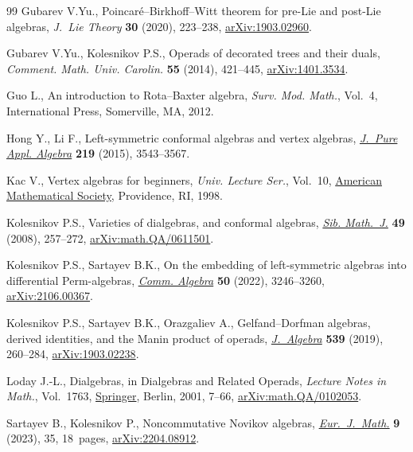 \documentclass[11pt]{article}
\numberwithin{equation}{section}
\numberwithin{equation}{section}
\begin{document}
\begin{thebibliography}{99}
Gubarev V.Yu., Poincar\'e--{B}irkhoff--{W}itt theorem for pre-{L}ie and post-{L}ie
 algebras, \textit{J.~Lie Theory} \textbf{30} (2020), 223--238,
 \href{https://arxiv.org/abs/1903.02960}{arXiv:1903.02960}.

Gubarev V.Yu., Kolesnikov P.S., Operads of decorated trees and their duals,
 \textit{Comment. Math. Univ. Carolin.} \textbf{55} (2014), 421--445,
 \href{https://arxiv.org/abs/1401.3534}{arXiv:1401.3534}.

Guo L., An introduction to {R}ota--{B}axter algebra, \textit{Surv. Mod. Math.},
 Vol.~4, International Press, Somerville, MA, 2012.

Hong Y., Li F., Left-symmetric conformal algebras and vertex algebras,
 \href{https://doi.org/10.1016/j.jpaa.2014.12.012}{\textit{J.~Pure Appl. Algebra}} \textbf{219} (2015), 3543--3567.

Kac V., Vertex algebras for beginners, \textit{Univ. Lecture Ser.}, Vol.~10,
 \href{https://doi.org/10.1090/ulect/010}{American Mathematical Society}, Providence, RI, 1998.

Kolesnikov P.S., Varieties of dialgebras, and conformal algebras, \href{https://doi.org/10.1007/s11202-008-0026-8}{\textit{Sib.
 Math.~J.}} \textbf{49} (2008), 257--272, \href{https://arxiv.org/abs/math.QA/0611501}{arXiv:math.QA/0611501}.

Kolesnikov P.S., Sartayev B.K., On the embedding of left-symmetric algebras
 into differential {P}erm-algebras, \href{https://doi.org/10.1080/00927872.2022.2028798}{\textit{Comm. Algebra}} \textbf{50} (2022),
 3246--3260, \href{https://arxiv.org/abs/2106.00367}{arXiv:2106.00367}.

Kolesnikov P.S., Sartayev B.K., Orazgaliev A., Gelfand--{D}orfman algebras,
 derived identities, and the {M}anin product of operads, \href{https://doi.org/10.1016/j.jalgebra.2019.07.034}{\textit{J.~Algebra}}
 \textbf{539} (2019), 260--284, \href{https://arxiv.org/abs/1903.02238}{arXiv:1903.02238}.

Loday J.-L., Dialgebras, in Dialgebras and {R}elated {O}perads, \textit{Lecture
 Notes in Math.}, Vol.~1763, \href{https://doi.org/10.1007/3-540-45328-8_2}{Springer}, Berlin, 2001, 7--66,
 \href{https://arxiv.org/abs/math.QA/0102053}{arXiv:math.QA/0102053}.

Sartayev B., Kolesnikov P., Noncommutative {N}ovikov algebras,
 \href{https://doi.org/10.1007/s40879-023-00632-1}{\textit{Eur.~J.~Math.}} \textbf{9} (2023), 35, 18~pages, \href{https://arxiv.org/abs/2204.08912}{arXiv:2204.08912}.


\end{thebibliography}
\end{document}
